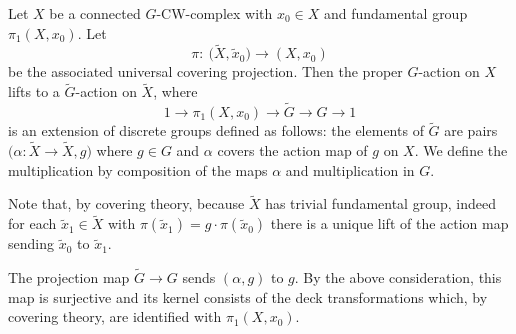 Let $X$ be a connected $G$-CW-complex with $x_0\in X$ and fundamental group
	$\pi_1(X,x_0)$. Let
	\begin{equation*}
		\pi\colon\ \bigl(\tilde{X},\tilde x_0\bigr)\to (X,x_0)
	\end{equation*}
	be the
	associated universal covering projection. Then the
	proper $G$-action on $X$ lifts to a $\widetilde{G}$-action on $\tilde{X}$,
	where
	\begin{equation*}
		1\to\pi_1(X,x_0)\to \widetilde{G}\to G\to 1
	\end{equation*}
	is an extension of
	discrete groups
	defined as follows: the elements of $\widetilde{G}$ are pairs
	$\bigl(\alpha\colon\tilde X\to\tilde X,g\bigr)$ where $g\in G$ and $\alpha$ covers the
	action map of $g$ on $X$. We define the multiplication by composition of the
	maps $\alpha$ and
	multiplication in $G$.
	
	Note that, by covering theory, because $\tilde X$
	has trivial fundamental group, indeed for each $\tilde x_1\in\tilde X$ with
	$\pi(\tilde x_1)=g\cdot \pi(\tilde x_0)$
	there is a unique lift of the action map sending $\tilde x_0$ to $\tilde
	x_1$.
	
	The projection map $\widetilde{G}\to G$ sends $(\alpha,g)$ to $g$. By
	the above consideration, this map is surjective and its kernel consists of
	the deck transformations which, by covering theory, are identified with
	$\pi_1(X,x_0)$.
	
